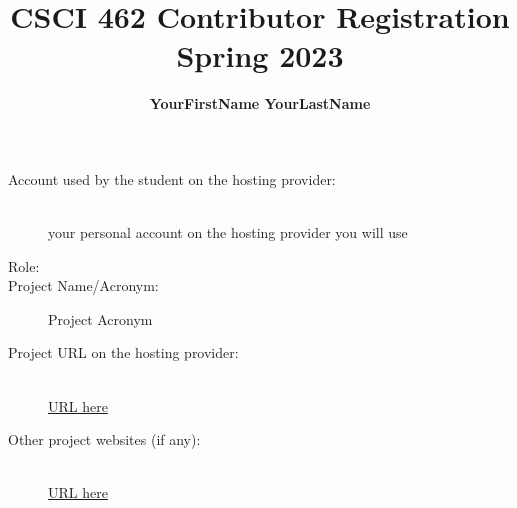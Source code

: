 \documentclass[runningheads]{llncs}
\begin{document}
%
\title{CSCI 462 Contributor Registration\\Spring 2023}
%
\author{\textbf{YourFirstName YourLastName}} %
%
%
%
\maketitle
%
\begin{description}
  \item[Account used by the student on the hosting provider:]\mbox{}\\
    your personal account on the hosting provider you will use
  \item[Role:] %
  \item[Project Name/Acronym:]
     Project Acronym %
\end{description}
\begin{description}
  \item[Project URL on the hosting provider:]\mbox{}\\
      \url{URL here} %
  \item[Other project websites (if any):]\mbox{}\\
      \url{URL here} %
\end{description}
\end{document}
